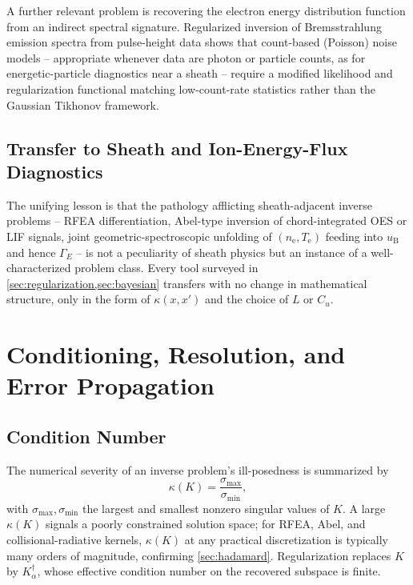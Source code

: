 A further relevant problem is recovering the electron energy distribution function from an indirect spectral signature. Regularized inversion of Bremsstrahlung emission spectra from pulse-height data shows that count-based (Poisson) noise models -- appropriate whenever data are photon or particle counts, as for energetic-particle diagnostics near a sheath -- require a modified likelihood and regularization functional matching low-count-rate statistics rather than the Gaussian Tikhonov framework.

\subsection{Transfer to Sheath and Ion-Energy-Flux Diagnostics}

The unifying lesson is that the pathology afflicting sheath-adjacent inverse problems -- RFEA differentiation, Abel-type inversion of chord-integrated OES or LIF signals, joint geometric-spectroscopic unfolding of $(n_{\mathrm{e}}, T_{\mathrm{e}})$ feeding into $u_{\mathrm{B}}$ and hence $\Gamma_{E}$ -- is not a peculiarity of sheath physics but an instance of a well-characterized problem class. Every tool surveyed in \cref{sec:regularization,sec:bayesian} transfers with no change in mathematical structure, only in the form of $\kappa(x,x')$ and the choice of $L$ or $C_u$.

\section{Conditioning, Resolution, and Error Propagation}
\label{sec:conditioning}

\subsection{Condition Number}

The numerical severity of an inverse problem's ill-posedness is summarized by
\begin{equation}
\kappa(K) = \frac{\sigma_{\max}}{\sigma_{\min}},
\label{eq:condition-number}
\end{equation}
with $\sigma_{\max}, \sigma_{\min}$ the largest and smallest nonzero singular values of $K$. A large $\kappa(K)$ signals a poorly constrained solution space; for RFEA, Abel, and collisional-radiative kernels, $\kappa(K)$ at any practical discretization is typically many orders of magnitude, confirming \cref{sec:hadamard}. Regularization replaces $K$ by $K_{\alpha}^{\dagger}$, whose effective condition number on the recovered subspace is finite.

